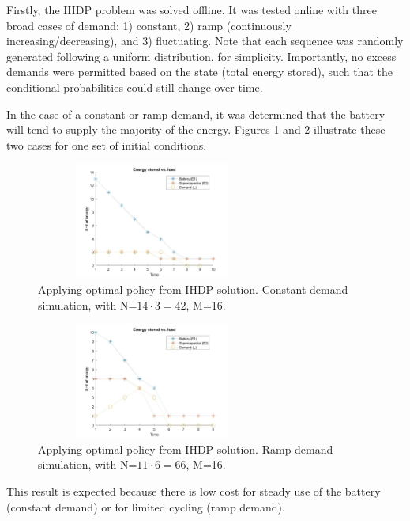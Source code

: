 \documentclass[conference]{IEEEtran}
\begin{document}
Firstly, the IHDP problem was solved offline. It was tested online with three broad cases of demand: 1) constant, 2) ramp (continuously increasing/decreasing), and 3) fluctuating. Note that each sequence was randomly generated following a uniform distribution, for simplicity. Importantly, no excess demands were permitted based on the state (total energy stored), such that the conditional probabilities could still change over time.

In the case of a constant or ramp demand, it was determined that the battery will tend to supply the majority of the energy. Figures 1 and 2 illustrate these two cases for one set of initial conditions.
\begin{figure}[htbp]
\centerline{\includegraphics[width=3in,height=1.5in]{EnergyStoredvsload_ConstantLoad(E1_max=13,E2_max=2).jpg}}
\caption{Applying optimal policy from IHDP solution. Constant demand simulation, with N=$14\cdot3=42$, M=16.}
\label{fig}
\end{figure}
\begin{figure}[htbp]
\centerline{\includegraphics[width=3in,height=1.5in]{EnergyStoredvsload_RampLoad(E1_max=10,E2_max=5).jpg}}
\caption{Applying optimal policy from IHDP solution. Ramp demand simulation, with N=$11\cdot6=66$, M=16.}
\label{fig}
\end{figure} This result is expected because there is low cost for steady use of the battery (constant demand) or for limited cycling (ramp demand).
\end{document}
